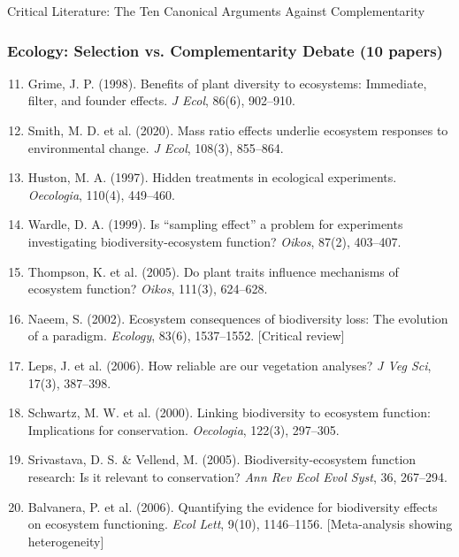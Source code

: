 \begin{chapter}{Critical Literature: The Ten Canonical Arguments Against Complementarity}
\subsubsection{Ecology: Selection vs. Complementarity Debate (10 papers)}

\begin{enumerate}
    \setcounter{enumi}{10}
    \item Grime, J. P. (1998). Benefits of plant diversity to ecosystems: Immediate, filter, and founder effects. \textit{J Ecol}, 86(6), 902--910.

    \item Smith, M. D. et al. (2020). Mass ratio effects underlie ecosystem responses to environmental change. \textit{J Ecol}, 108(3), 855--864.

    \item Huston, M. A. (1997). Hidden treatments in ecological experiments. \textit{Oecologia}, 110(4), 449--460.

    \item Wardle, D. A. (1999). Is ``sampling effect'' a problem for experiments investigating biodiversity-ecosystem function? \textit{Oikos}, 87(2), 403--407.

    \item Thompson, K. et al. (2005). Do plant traits influence mechanisms of ecosystem function? \textit{Oikos}, 111(3), 624--628.

    \item Naeem, S. (2002). Ecosystem consequences of biodiversity loss: The evolution of a paradigm. \textit{Ecology}, 83(6), 1537--1552. [Critical review]

    \item Leps, J. et al. (2006). How reliable are our vegetation analyses? \textit{J Veg Sci}, 17(3), 387--398.

    \item Schwartz, M. W. et al. (2000). Linking biodiversity to ecosystem function: Implications for conservation. \textit{Oecologia}, 122(3), 297--305.

    \item Srivastava, D. S. \& Vellend, M. (2005). Biodiversity-ecosystem function research: Is it relevant to conservation? \textit{Ann Rev Ecol Evol Syst}, 36, 267--294.

    \item Balvanera, P. et al. (2006). Quantifying the evidence for biodiversity effects on ecosystem functioning. \textit{Ecol Lett}, 9(10), 1146--1156. [Meta-analysis showing heterogeneity]
\end{enumerate}


\end{chapter}
